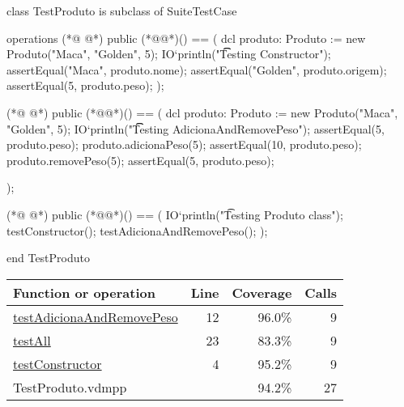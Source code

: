 \begin{vdmpp}[breaklines=true]
class TestProduto is subclass of SuiteTestCase

operations
(*@
\label{testConstructor:4}
@*)
  public (*@@*)() == (
   dcl produto: Produto := new Produto("Maca", "Golden", 5);
    IO`println("\t\t Testing Constructor");
    assertEqual("Maca", produto.nome);
    assertEqual("Golden", produto.origem);
    assertEqual(5, produto.peso);
  );
  
(*@
\label{testAdicionaAndRemovePeso:12}
@*)
  public (*@@*)() == (
   dcl produto: Produto := new Produto("Maca", "Golden", 5);
  IO`println("\t\t Testing AdicionaAndRemovePeso");
  assertEqual(5, produto.peso);
  produto.adicionaPeso(5);
  assertEqual(10, produto.peso);
  produto.removePeso(5);
  assertEqual(5, produto.peso);
  
  );

(*@
\label{testAll:23}
@*)
  public (*@@*)() == (
    IO`println("\t Testing Produto class");
    testConstructor();
    testAdicionaAndRemovePeso();
  );

end TestProduto
\end{vdmpp}
\bigskip
\begin{longtable}{|l|r|r|r|}
\hline
Function or operation & Line & Coverage & Calls \\
\hline
\hline
\hyperref[testAdicionaAndRemovePeso:12]{testAdicionaAndRemovePeso} & 12&96.0\% & 9 \\
\hline
\hyperref[testAll:23]{testAll} & 23&83.3\% & 9 \\
\hline
\hyperref[testConstructor:4]{testConstructor} & 4&95.2\% & 9 \\
\hline
\hline
TestProduto.vdmpp & & 94.2\% & 27 \\
\hline
\end{longtable}

